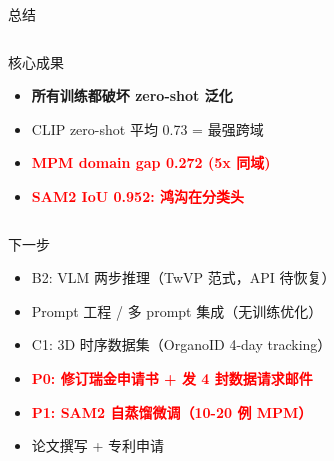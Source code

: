\documentclass[aspectratio=169, 10pt]{beamer}
\begin{document}
\begin{frame}{总结}
\begin{columns}[T]
\begin{alertblock}{核心成果}
\begin{itemize}
        \item \textbf{所有训练都破坏 zero-shot 泛化}
        \item CLIP zero-shot 平均 0.73 = 最强跨域
        \item \textcolor{red}{\textbf{MPM domain gap 0.272 (5x 同域)}}
        \item \textcolor{red}{\textbf{SAM2 IoU 0.952: 鸿沟在分类头}}
      \end{itemize}
    \end{alertblock}
  \end{columns}
  \vspace{0em}
  \begin{alertblock}{下一步}
    \begin{itemize}
      \item B2: VLM 两步推理（TwVP 范式，API 待恢复）
      \item Prompt 工程 / 多 prompt 集成（无训练优化）
      \item C1: 3D 时序数据集（OrganoID 4-day tracking）
      \item \textcolor{red}{\textbf{P0: 修订瑞金申请书 + 发 4 封数据请求邮件}}
      \item \textcolor{red}{\textbf{P1: SAM2 自蒸馏微调（10-20 例 MPM）}}
      \item 论文撰写 + 专利申请
    \end{itemize}
  \end{alertblock}
\end{frame}
\end{document}

